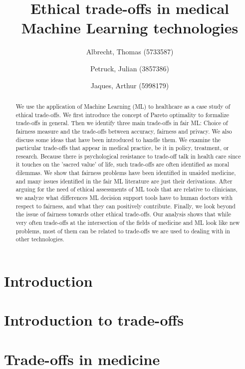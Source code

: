 \documentclass[11pt,english]{article}
\title{Ethical trade-offs in medical Machine Learning technologies}
\author{
    Albrecht, Thomas (5733587)
    \and
    Petruck, Julian (3857386)
    \and
    Jaques, Arthur (5998179)}
\begin{document}

\maketitle

\begin{abstract}
We use the application of Machine Learning (ML) to healthcare as a case study of ethical trade-offs.
We first introduce the concept of Pareto optimality to formalize trade-offs in general.
Then we identify three main trade-offs in fair ML: Choice of fairness measure and the trade-offs between accuracy, fairness and privacy. 
We also discuss some ideas that have been introduced to handle them.
We examine the particular trade-offs that appear in medical practice, be it in policy, treatment, or research. Because there is psychological resistance to trade-off talk in health care since it touches on the 'sacred value’ of life, such trade-offs are often identified as moral dilemmas. We show that fairness problems have been identified in unaided medicine, and many issues identified in the fair ML literature are just their derivations. After arguing for the need of ethical assessments of ML tools that are relative to clinicians, we analyze what differences ML decision support tools have to human doctors with respect to fairness, and what they can positively contribute.
Finally, we look beyond the issue of fairness towards other ethical trade-offs. Our analysis shows that while very often trade-offs at the intersection of the fields of medicine and ML look like new problems, most of them can be related to trade-offs we are used to dealing with in other technologies.
\end{abstract}


\clearpage
\setcounter{tocdepth}{2}
\tableofcontents
\clearpage


\section{Introduction}
\label{introduction}


\section{Introduction to trade-offs}
\label{tradeoff}


\section{Trade-offs in medicine}
\label{medicine}

\end{document}
